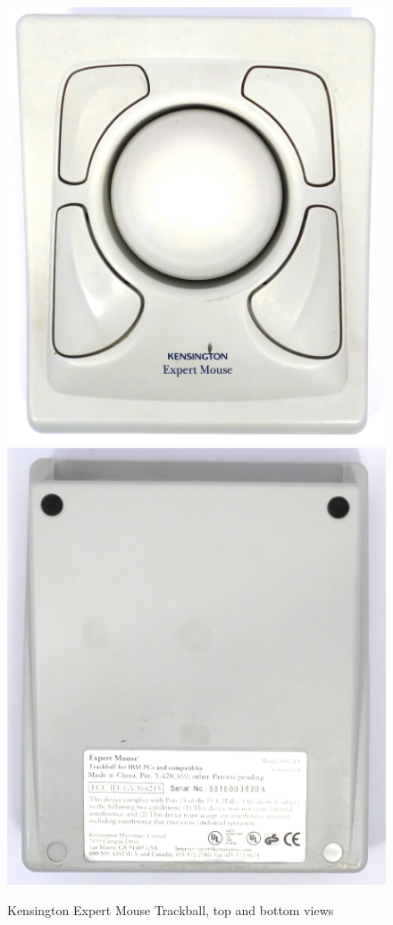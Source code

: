 \documentclass[11pt, a4paper]{article}
\begin{document}
\begin{figure}[h]
    \centering
    \includegraphics[scale=0.4]{1996_kensington_expert_trackball_5/top_30.jpg}
    \includegraphics[scale=0.4]{1996_kensington_expert_trackball_5/bottom_30.jpg}
    \caption{Kensington Expert Mouse Trackball, top and bottom views}
    \label{fig:ExpertMouseTopBottom}
\end{figure}
\end{document}
